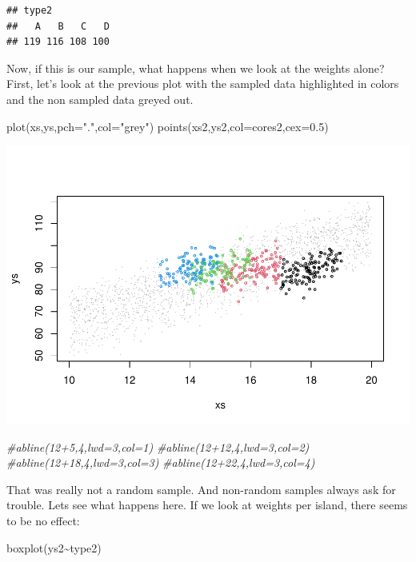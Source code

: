 \documentclass[
]{book}
\newenvironment{Shaded}{\begin{snugshade}}{\end{snugshade}}
\newcommand{\AttributeTok}[1]{\textcolor[rgb]{0.77,0.63,0.00}{#1}}
\newcommand{\CommentTok}[1]{\textcolor[rgb]{0.56,0.35,0.01}{\textit{#1}}}
\newcommand{\FloatTok}[1]{\textcolor[rgb]{0.00,0.00,0.81}{#1}}
\newcommand{\FunctionTok}[1]{\textcolor[rgb]{0.00,0.00,0.00}{#1}}
\newcommand{\NormalTok}[1]{#1}
\newcommand{\SpecialCharTok}[1]{\textcolor[rgb]{0.00,0.00,0.00}{#1}}
\newcommand{\StringTok}[1]{\textcolor[rgb]{0.31,0.60,0.02}{#1}}
\begin{document}
\begin{verbatim}
## type2
##   A   B   C   D 
## 119 116 108 100
\end{verbatim}

Now, if this is our sample, what happens when we look at the weights alone? First, let's look at the previous plot with the sampled data highlighted in colors and the non sampled data greyed out.

\begin{Shaded}
\begin{Highlighting}[]
\FunctionTok{plot}\NormalTok{(xs,ys,}\AttributeTok{pch=}\StringTok{"."}\NormalTok{,}\AttributeTok{col=}\StringTok{"grey"}\NormalTok{)}
\FunctionTok{points}\NormalTok{(xs2,ys2,}\AttributeTok{col=}\NormalTok{cores2,}\AttributeTok{cex=}\FloatTok{0.5}\NormalTok{)}
\end{Highlighting}
\end{Shaded}

\includegraphics{ECOMODbook_files/figure-latex/a10.11-1.pdf}

\begin{Shaded}
\begin{Highlighting}[]
\CommentTok{\#abline(12+5,4,lwd=3,col=1)}
\CommentTok{\#abline(12+12,4,lwd=3,col=2)}
\CommentTok{\#abline(12+18,4,lwd=3,col=3)}
\CommentTok{\#abline(12+22,4,lwd=3,col=4)}
\end{Highlighting}
\end{Shaded}

That was really not a random sample. And non-random samples always ask for trouble. Lets see what happens here. If we look at weights per island, there seems to be no effect:

\begin{Shaded}
\begin{Highlighting}[]
\FunctionTok{boxplot}\NormalTok{(ys2}\SpecialCharTok{\textasciitilde{}}\NormalTok{type2)}
\end{Highlighting}
\end{Shaded}
\end{document}
